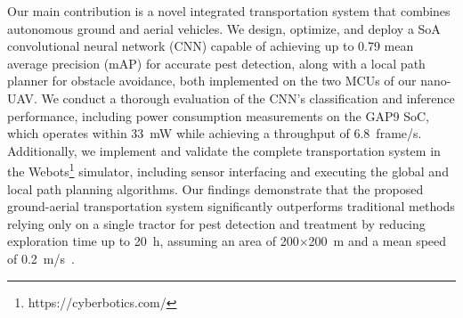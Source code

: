 Our main contribution is a novel integrated transportation system that combines autonomous ground and aerial vehicles. 
We design, optimize, and deploy a SoA convolutional neural network (CNN) capable of achieving up to 0.79 mean average precision (mAP) for accurate pest detection, along with a local path planner for obstacle avoidance, both implemented on the two MCUs of our nano-UAV. 
We conduct a thorough evaluation of the CNN’s classification and inference performance, including power consumption measurements on the GAP9 SoC, which operates within \SI{33}{\milli\watt} while achieving a throughput of \SI{6.8}{frame/\second}. 
Additionally, we implement and validate the complete transportation system in the Webots\footnote{https://cyberbotics.com/} simulator, including sensor interfacing and executing the global and local path planning algorithms.
Our findings demonstrate that the proposed ground-aerial transportation system significantly outperforms traditional methods relying only on a single tractor for pest detection and treatment by reducing exploration time up to \SI{20}{\hour}, assuming an area of 200$\times$\SI{200}{\meter} and a mean speed of \SI{0.2}{\meter/\second}~\cite{9177181}.